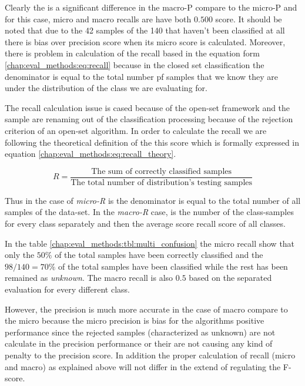 Clearly the is a significant difference in the macro-P compare to the micro-P and for this case, micro and macro recalls are have both $0.500$ score. It should be noted that due to the 42 samples of the 140 that haven't been classified at all there is bias over precision score when its micro score is calculated. Moreover, there is problem in calculation of the recall based in the equation form \ref{chap:eval_methods:eq:recall} because in the closed set classification the denominator is equal to the total number pf samples that we know they are under the distribution of the class we are evaluating for. 

The recall calculation issue is cased because of the open-set framework and the sample are renaming out of the classification processing because of the rejection criterion of an open-set algorithm. In order to calculate the recall we are following the theoretical definition of the this score which is formally expressed in equation \ref{chap:eval_methods:eq:recall_theory}.

\begin{equation}\label{chap:eval_methods:eq:recall_theory}
	R = \frac {\text{The sum of correctly classified samples}} {\text{The total number of distribution's testing samples}}
\end{equation}

Thus in the case of \textit{micro-R} is the denominator is equal to the total number of all samples of the data-set. In the \textit{macro-R} case, is the number of the class-samples for every class separately and then the average score recall score of all classes.

In the table \ref{chap:eval_methods:tbl:multi_confusion} the micro recall show that only the $50\%$ of the total samples have been correctly classified and the $98/140 = 70\%$ of the total samples have been classified while the rest has been remained as \textit{unknown}. The macro recall is also $0.5$ based on the separated evaluation for every different class.

However, the precision is much more accurate in the case of macro compare to the micro because the micro precision is bias for the algorithms positive performance since the rejected samples (characterized as unknown) are not calculate in the precision performance or their are not causing any kind of penalty to the precision score. In addition the proper calculation of recall (micro and macro) as explained above will not differ in the extend of regulating the F-score.

